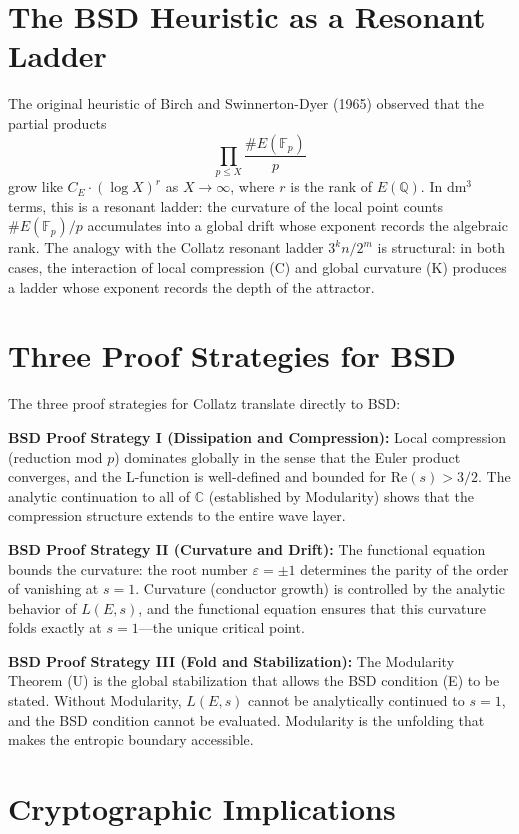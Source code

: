 \documentclass[14pt, twoside, openright]{book}
\theoremstyle{definition}
\theoremstyle{remark}
\begin{document}
\section{The BSD Heuristic as a Resonant Ladder}

The original heuristic of Birch and Swinnerton-Dyer (1965) observed that the
partial products
\[
  \prod_{p \leq X} \frac{\#E(\mathbb{F}_p)}{p}
\]
grow like $C_E \cdot (\log X)^{r}$ as $X \to \infty$, where $r$ is the rank of
$E(\mathbb{Q})$. In dm$^{3}$ terms, this is a resonant ladder: the curvature of
the local point counts $\#E(\mathbb{F}_p)/p$ accumulates into a global drift
whose exponent records the algebraic rank. The analogy with the Collatz resonant
ladder $3^{k}n / 2^{m}$ is structural: in both cases, the interaction of local
compression (C) and global curvature (K) produces a ladder whose exponent records
the depth of the attractor.

\section{Three Proof Strategies for BSD}

The three proof strategies for Collatz translate directly to BSD:

\textbf{BSD Proof Strategy I (Dissipation and Compression):} Local compression
(reduction mod $p$) dominates globally in the sense that the Euler product
converges, and the L-function is well-defined and bounded for
$\mathrm{Re}(s) > 3/2$. The analytic continuation to all of $\mathbb{C}$
(established by Modularity) shows that the compression structure extends to the
entire wave layer.

\textbf{BSD Proof Strategy II (Curvature and Drift):} The functional equation
bounds the curvature: the root number $\varepsilon = \pm 1$ determines the parity
of the order of vanishing at $s = 1$. Curvature (conductor growth) is controlled
by the analytic behavior of $L(E,s)$, and the functional equation ensures that
this curvature folds exactly at $s = 1$---the unique critical point.

\textbf{BSD Proof Strategy III (Fold and Stabilization):} The Modularity Theorem
(U) is the global stabilization that allows the BSD condition (E) to be stated.
Without Modularity, $L(E,s)$ cannot be analytically continued to $s = 1$, and
the BSD condition cannot be evaluated. Modularity is the unfolding that makes
the entropic boundary accessible.

\section{Cryptographic Implications}
\end{document}
